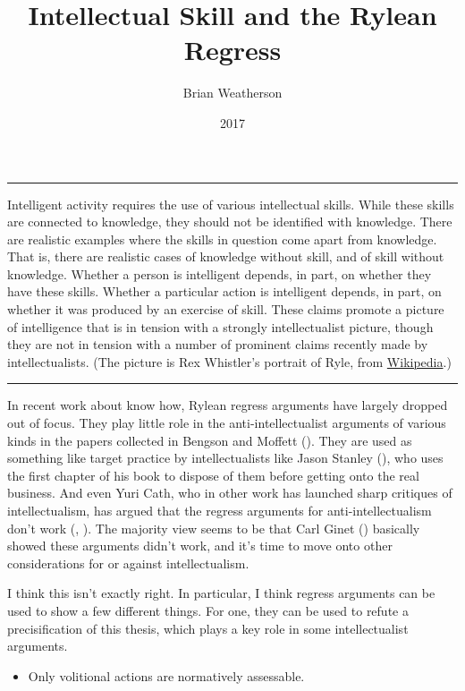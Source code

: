 \documentclass[
  10pt,
  letterpaper,
  DIV=11,
  numbers=noendperiod,
  twoside]{scrartcl}
\title{Intellectual Skill and the Rylean Regress}
\author{Brian Weatherson}
\date{2017}
\providecommand{\tightlist}{%
  \setlength{\itemsep}{0pt}\setlength{\parskip}{0pt}}\usepackage{longtable,booktabs,array}
\renewenvironment{abstract}
 {\vspace{-1.25cm}
 \quotation\small\noindent\rule{\linewidth}{.5pt}\par\smallskip
 \noindent }
 {\par\noindent\rule{\linewidth}{.5pt}\endquotation}
\begin{document}
\maketitle
\begin{abstract}
Intelligent activity requires the use of various intellectual skills.
While these skills are connected to knowledge, they should not be
identified with knowledge. There are realistic examples where the skills
in question come apart from knowledge. That is, there are realistic
cases of knowledge without skill, and of skill without knowledge.
Whether a person is intelligent depends, in part, on whether they have
these skills. Whether a particular action is intelligent depends, in
part, on whether it was produced by an exercise of skill. These claims
promote a picture of intelligence that is in tension with a strongly
intellectualist picture, though they are not in tension with a number of
prominent claims recently made by intellectualists. (The picture is Rex
Whistler's portrait of Ryle, from
\href{https://en.wikipedia.org/wiki/Gilbert_Ryle\#/media/File:Rex_Whistler_-_Gilbert_Ryle,_Fellow.jpg}{Wikipedia}.)
\end{abstract}

In recent work about know how, Rylean regress arguments have largely
dropped out of focus. They play little role in the anti-intellectualist
arguments of various kinds in the papers collected in Bengson and
Moffett (). They are used as
something like target practice by intellectualists like Jason Stanley
(), who uses the first chapter of his
book to dispose of them before getting onto the real business. And even
Yuri Cath, who in other work has launched sharp critiques of
intellectualism, has argued that the regress arguments for
anti-intellectualism don't work (,
). The majority view seems to be that Carl
Ginet () basically showed these arguments
didn't work, and it's time to move onto other considerations for or
against intellectualism.

I think this isn't exactly right. In particular, I think regress
arguments can be used to show a few different things. For one, they can
be used to refute a precisification of this thesis, which plays a key
role in some intellectualist arguments.

\begin{itemize}
\tightlist
\item
  Only volitional actions are normatively assessable.
\end{itemize}
\end{document}

